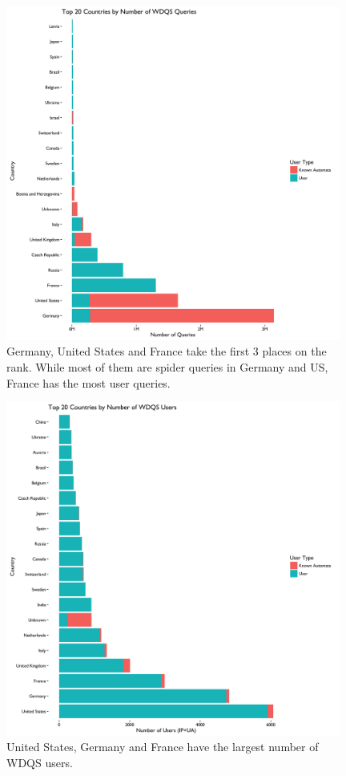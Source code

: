 \documentclass[12pt,]{article}
\begin{document}
\begin{figure}[H]
\centering
\includegraphics[width=11cm,height=11cm,keepaspectratio]{figures/n_query_by_country.png}
\caption{Germany, United States and France take the first 3 places on
the rank. While most of them are spider queries in Germany and US,
France has the most user queries.}
\end{figure}

\begin{figure}[H]
\centering
\includegraphics[width=11cm,height=11cm,keepaspectratio]{figures/n_user_by_country.png}
\caption{United States, Germany and France have the largest number of
WDQS users.}
\end{figure}
\end{document}
